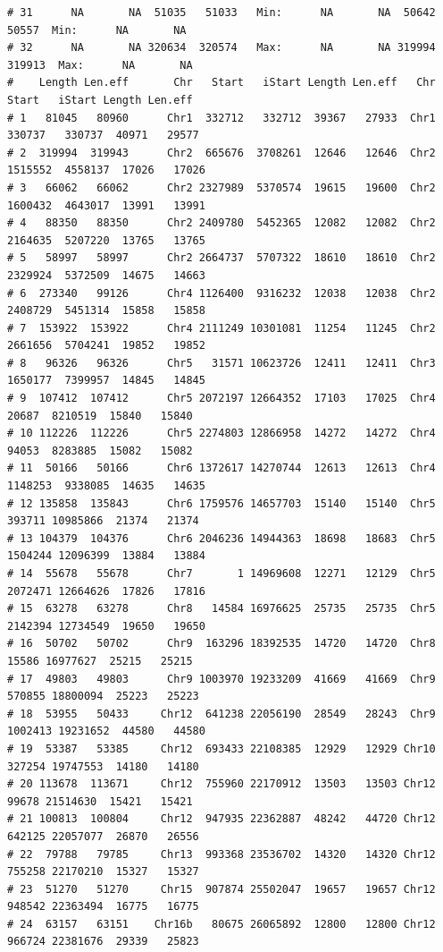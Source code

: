 \documentclass{article}\usepackage[]{graphicx}\usepackage[]{color}
\makeatletter
\newenvironment{kframe}{%
 \def\at@end@of@kframe{}%
 \ifinner\ifhmode%
  \def\at@end@of@kframe{\end{minipage}}%
  \begin{minipage}{\columnwidth}%
 \fi\fi%
 \def\FrameCommand##1{\hskip\@totalleftmargin \hskip-\fboxsep
 \colorbox{shadecolor}{##1}\hskip-\fboxsep
     \hskip-\linewidth \hskip-\@totalleftmargin \hskip\columnwidth}%
 \MakeFramed {\advance\hsize-\width
   \@totalleftmargin\z@ \linewidth\hsize
   \@setminipage}}%
 {\par\unskip\endMakeFramed%
 \at@end@of@kframe}
\newenvironment{knitrout}{}{} %
\makeatother
\begin{document}
\begin{knitrout}
\begin{kframe}
\begin{verbatim}
# 31      NA       NA  51035   51033   Min:      NA       NA  50642   50557  Min:      NA       NA
# 32      NA       NA 320634  320574   Max:      NA       NA 319994  319913  Max:      NA       NA
#    Length Len.eff       Chr   Start   iStart Length Len.eff   Chr   Start   iStart Length Len.eff
# 1   81045   80960      Chr1  332712   332712  39367   27933  Chr1  330737   330737  40971   29577
# 2  319994  319943      Chr2  665676  3708261  12646   12646  Chr2 1515552  4558137  17026   17026
# 3   66062   66062      Chr2 2327989  5370574  19615   19600  Chr2 1600432  4643017  13991   13991
# 4   88350   88350      Chr2 2409780  5452365  12082   12082  Chr2 2164635  5207220  13765   13765
# 5   58997   58997      Chr2 2664737  5707322  18610   18610  Chr2 2329924  5372509  14675   14663
# 6  273340   99126      Chr4 1126400  9316232  12038   12038  Chr2 2408729  5451314  15858   15858
# 7  153922  153922      Chr4 2111249 10301081  11254   11245  Chr2 2661656  5704241  19852   19852
# 8   96326   96326      Chr5   31571 10623726  12411   12411  Chr3 1650177  7399957  14845   14845
# 9  107412  107412      Chr5 2072197 12664352  17103   17025  Chr4   20687  8210519  15840   15840
# 10 112226  112226      Chr5 2274803 12866958  14272   14272  Chr4   94053  8283885  15082   15082
# 11  50166   50166      Chr6 1372617 14270744  12613   12613  Chr4 1148253  9338085  14635   14635
# 12 135858  135843      Chr6 1759576 14657703  15140   15140  Chr5  393711 10985866  21374   21374
# 13 104379  104376      Chr6 2046236 14944363  18698   18683  Chr5 1504244 12096399  13884   13884
# 14  55678   55678      Chr7       1 14969608  12271   12129  Chr5 2072471 12664626  17826   17816
# 15  63278   63278      Chr8   14584 16976625  25735   25735  Chr5 2142394 12734549  19650   19650
# 16  50702   50702      Chr9  163296 18392535  14720   14720  Chr8   15586 16977627  25215   25215
# 17  49803   49803      Chr9 1003970 19233209  41669   41669  Chr9  570855 18800094  25223   25223
# 18  53955   50433     Chr12  641238 22056190  28549   28243  Chr9 1002413 19231652  44580   44580
# 19  53387   53385     Chr12  693433 22108385  12929   12929 Chr10  327254 19747553  14180   14180
# 20 113678  113671     Chr12  755960 22170912  13503   13503 Chr12   99678 21514630  15421   15421
# 21 100813  100804     Chr12  947935 22362887  48242   44720 Chr12  642125 22057077  26870   26556
# 22  79788   79785     Chr13  993368 23536702  14320   14320 Chr12  755258 22170210  15327   15327
# 23  51270   51270     Chr15  907874 25502047  19657   19657 Chr12  948542 22363494  16775   16775
# 24  63157   63151    Chr16b   80675 26065892  12800   12800 Chr12  966724 22381676  29339   25823

\end{verbatim}
\end{kframe}
\end{knitrout}
\end{document}
